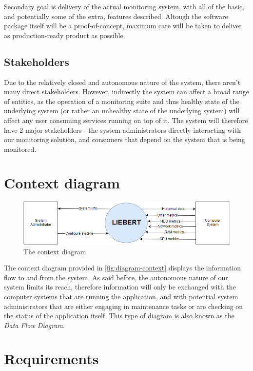 \documentclass[12pt,a4paper,table]{article}
\begin{document}
            Secondary goal is delivery of the actual monitoring system, with all of the basic, and potentially some of the extra, features described. Altough the software package itself will be a proof-of-concept, maximum care will be taken to deliver as production-ready product as possible.

        \subsection{Stakeholders}
            Due to the relatively closed and autonomous nature of the system, there aren't many direct stakeholders. However, indirectly the system can affect a broad range of entities, as the operation of a monitoring suite and thus healthy state of the underlying system (or rather an unhealthy state of the underlying system) will affect any user consuming services running on top of it. The system will therefore have 2 major stakeholders - the system administrators directly interacting with our monitoring solution, and consumers that depend on the system that is being monitored.
    \section{Context diagram}
        \begin{figure}[!htb]
            \includegraphics[width=\textwidth]{diagram-context.png}
            \caption{The context diagram}
            \label{fig:diagram-context}
        \end{figure}

        The context diagram provided in \autoref{fig:diagram-context} displays the information flow to and from the system. As said before, the autonomous nature of our system limits its reach, therefore information will only be exchanged with the computer systems that are running the application, and with potential system administrators that are either engaging in maintenance tasks or are checking on the status of the application itself. This type of diagram is also known as the \textit{Data Flow Diagram}.

    \section{Requirements}
\end{document}
